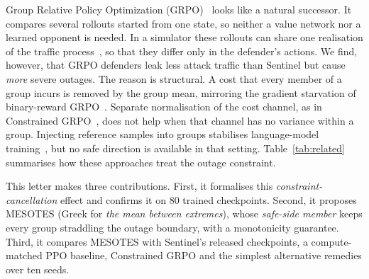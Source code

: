 \documentclass[journal]{IEEEtran}
\begin{document}
Group Relative Policy Optimization (GRPO)~\cite{shao2024deepseekmath} looks like a natural successor. It compares several rollouts started from one state, so neither a value network nor a learned opponent is needed. In a simulator these rollouts can share one realisation of the traffic process~\cite{ng2000pegasus}, so that they differ only in the defender's actions. We find, however, that GRPO defenders leak less attack traffic than Sentinel but cause \emph{more} severe outages. The reason is structural. A cost that every member of a group incurs is removed by the group mean, mirroring the gradient starvation of binary-reward GRPO~\cite{nie2026starvation,yu2025dapo}. Separate normalisation of the cost channel, as in Constrained GRPO~\cite{girgis2026cgrpo}, does not help when that channel has no variance within a group. Injecting reference samples into groups stabilises language-model training~\cite{yan2025luffy,armor2026}, but no safe direction is available in that setting. Table~\ref{tab:related} summarises how these approaches treat the outage constraint.

\begin{table}[t]
\centering
\caption{Treatment of the Outage Constraint by Related Approaches}
\label{tab:related}
\setlength{\tabcolsep}{2.5pt}
\end{table}

This letter makes three contributions. First, it formalises this \emph{constraint-cancellation} effect and confirms it on 80 trained checkpoints. Second, it proposes MESOTES (Greek for \emph{the mean between extremes}), whose \emph{safe-side member} keeps every group straddling the outage boundary, with a monotonicity guarantee. Third, it compares MESOTES with Sentinel's released checkpoints, a compute-matched PPO baseline, Constrained GRPO and the simplest alternative remedies over ten seeds.
\end{document}
